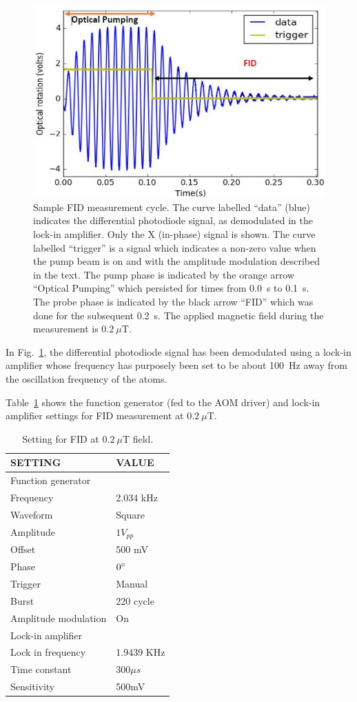 \begin{figure}%
\centering\includegraphics[width=0.55\linewidth]{figures/Capture2}
\caption{Sample FID measurement cycle.  The curve labelled ``data''
  (blue) indicates the differential photodiode signal, as demodulated
  in the lock-in amplifier.  Only the X (in-phase) signal is shown.
  The curve labelled ``trigger'' is a signal which indicates a
  non-zero value when the pump beam is on and with the amplitude
  modulation described in the text.  The pump phase is indicated by
  the orange arrow ``Optical Pumping'' which persisted for times from
  0.0~s to 0.1~s.  The probe phase is indicated by the black arrow
  ``FID'' which was done for the subsequent 0.2~s. The applied
  magnetic field during the measurement is
  $0.2~\mu$T.\label{fig:FID_example}}
\end{figure}

In Fig.~\ref{fig:FID_example}, the differential photodiode signal has
been demodulated using a lock-in amplifier whose frequency has
purposely been set to be about 100~Hz away from the oscillation
frequency of the atoms.

Table~\ref{tab:FID_setting} shows the function generator (fed to the
AOM driver) and lock-in amplifier settings for FID measurement at
$0.2~\mu$T.

\begin{table}[h]
\centering
\begin{tabular}{|l |l|}
\hline

\textbf{ SETTING}    & \textbf{VALUE} \\
\hline
Function generator &   \\
\hline
Frequency & 2.034 kHz   \\

Waveform    &  Square  \\

Amplitude   &  $1V_{pp}$  \\
Offset  &       500 mV  \\
Phase       &    $0\degree$ \\
Trigger     &   Manual  \\
Burst       &    220 cycle \\
Amplitude modulation & On \\
\hline
Lock-in amplifier &     \\
\hline
Lock in frequency     & 1.9439 KHz \\
Time constant     &  $300\mu s$ \\
Sensitivity      &  500mV  \\
\hline
\end{tabular}
\caption{Setting for FID at $0.2~\mu$T field.\label{tab:FID_setting}}
\end{table}

